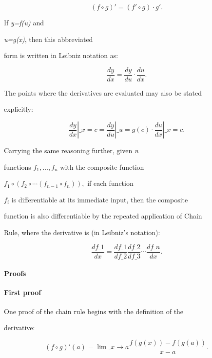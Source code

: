 {$$(f\circ g)' = (f'\circ g) \cdot g'.$$



If \textit{y=f(u)} and

\textit{u=g(x)}, then this abbreviated

form is written in Leibniz notation as:



$$\frac{dy}{dx} = \frac{dy}{du} \cdot \frac{du}{dx}.$$



The points where the derivatives are evaluated may also be stated

explicitly:



$$\left.\frac{dy}{dx}\right|\_{x=c} = \left.\frac{dy}{du}\right|\_{u = g(c)} \cdot \left.\frac{du}{dx}\right|\_{x=c}.$$



Carrying the same reasoning further, given \textit{n}

functions $f_1, \ldots, f_n\!$ with the composite function

$f_1 \circ ( f_2 \circ \cdots (f_{n-1} \circ f_n) )\!,$ if each function

$f_i\!$ is differentiable at its immediate input, then the composite

function is also differentiable by the repeated application of Chain

Rule, where the derivative is (in Leibniz's notation):



$$\frac{df\_1}{dx} = \frac{df\_1}{df\_2}\frac{df\_2}{df\_3}\cdots\frac{df\_n}{dx}.$$



\paragraph{Proofs}



\paragraph{First proof}



One proof of the chain rule begins with the definition of the

derivative:



$$(f \circ g)'(a) = \lim\_{x \to a} \frac{f(g(x)) - f(g(a))}{x - a}.$$



}
